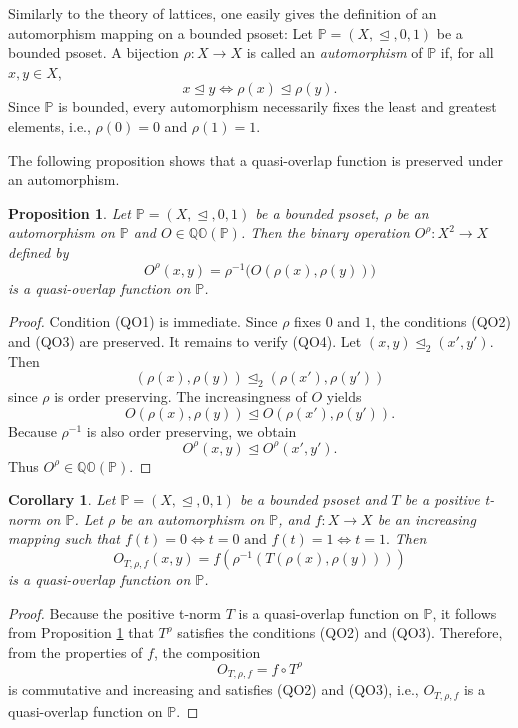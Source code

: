 \documentclass[preprint,12pt]{elsarticle}
\newtheorem{proposition}[theorem]{Proposition}
\newtheorem{corollary}[theorem]{Corollary}
\begin{document}
Similarly to the theory of lattices, one easily gives the definition of an automorphism mapping on a bounded psoset:
Let $\mathbb{P}=(X,\trianglelefteq,0,1)$ be a bounded psoset. A bijection $\rho:X\to X$ is called an \emph{automorphism} of $\mathbb{P}$ if, for all $x,y\in X$,
$$
x\trianglelefteq y
\Longleftrightarrow
\rho(x)\trianglelefteq\rho(y).
$$
Since $\mathbb{P}$ is bounded, every automorphism necessarily fixes
the least and greatest elements, i.e., $\rho(0)=0$ and $\rho(1)=1$.

The following proposition shows that a quasi-overlap function is preserved under an automorphism.
\begin{proposition}\label{prop:automorphism}
Let $\mathbb{P}=(X,\trianglelefteq,0,1)$ be a bounded psoset, $\rho$ be an automorphism on $\mathbb{P}$ and $O\in\mathbb{QO}(\mathbb{P})$. Then the binary operation $O^\rho:X^2\to X$ defined by
\begin{equation}\label{eq1}
 O^\rho(x,y)=\rho^{-1}\bigl(O(\rho(x),\rho(y))\bigr)
\end{equation}
is a quasi-overlap function on $\mathbb{P}$.
\end{proposition}

\begin{proof}
Condition (QO1) is immediate. Since $\rho$ fixes $0$ and $1$, the conditions (QO2) and (QO3) are preserved. It remains to verify (QO4). Let $(x,y)\trianglelefteq_2(x',y')$. Then
$$
 (\rho(x),\rho(y))\trianglelefteq_2(\rho(x'),\rho(y'))
$$ since $\rho$ is order preserving.
The increasingness of $O$ yields
$$
 O(\rho(x),\rho(y))\trianglelefteq O(\rho(x'),\rho(y')).
$$
Because $\rho^{-1}$ is also order preserving, we obtain
$$
 O^\rho(x,y)\trianglelefteq O^\rho(x',y').
$$
Thus $O^\rho\in\mathbb{QO}(\mathbb{P})$.
\end{proof}

\begin{corollary}\label{cor:tnorm-generated}
Let $\mathbb{P}=(X,\trianglelefteq,0,1)$ be a bounded psoset and $T$ be a positive t-norm on $\mathbb{P}$. Let $\rho$ be an automorphism on $\mathbb{P}$, and $f:X\to X$ be an increasing mapping such that
$
 f(t)=0\Longleftrightarrow t=0\mbox{ and }
 f(t)=1\Longleftrightarrow t=1.
$
Then
$$
 O_{T,\rho,f}(x,y)=f\!\left(\rho^{-1}(T(\rho(x),\rho(y)))\right)
$$
is a quasi-overlap function on $\mathbb{P}$.
\end{corollary}

\begin{proof}
Because the positive t-norm $T$ is a quasi-overlap function on $\mathbb{P}$, it follows from Proposition \ref{prop:automorphism} that $T^\rho$ satisfies the conditions (QO2) and (QO3). Therefore, from the properties of $f$, the composition
$$
 O_{T,\rho,f}=f\circ T^\rho
$$
is commutative and increasing and satisfies (QO2) and (QO3), i.e., $O_{T,\rho,f}$ is a quasi-overlap function on $\mathbb{P}$.
\end{proof}
\end{document}
